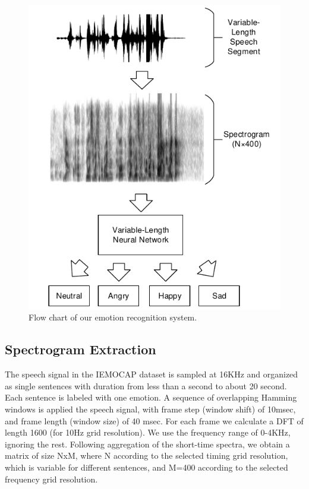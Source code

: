 \documentclass[a4paper]{article}
\begin{document}
\begin{figure}[!htb]
\centering
\centerline{\includegraphics{flow}}
\caption{Flow chart of our emotion recognition system.}
\label{fig:flow}
\end{figure}

\subsection{Spectrogram Extraction}
\label{ssec:spectrogram_extraction}

The speech signal in the IEMOCAP dataset is sampled at 16KHz and organized as single sentences with duration from less than a second to about 20 second. Each sentence is labeled with one emotion. A sequence of overlapping Hamming windows is applied the speech signal, with frame step (window shift) of 10msec, and frame length (window size) of 40 msec. For each frame we calculate a DFT of length 1600 (for 10Hz grid resolution). We use the frequency range of 0-4KHz, ignoring the rest. Following aggregation of the short-time spectra, we obtain a matrix of size NxM, where N according to the selected timing grid resolution, which is variable for different sentences,  and M=400 according to the selected frequency grid resolution.
\end{document}
